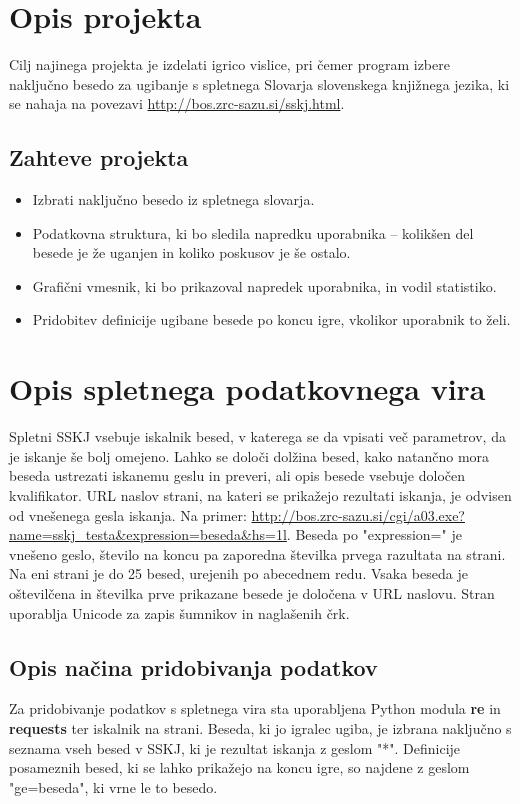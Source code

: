 \documentclass [a4paper, 12pt] {article}
\begin{document}
\section {Opis projekta}
Cilj najinega projekta je izdelati igrico vislice, pri čemer program izbere naključno besedo za ugibanje s spletnega Slovarja slovenskega knjižnega jezika, ki se nahaja na povezavi \url {http://bos.zrc-sazu.si/sskj.html}.
\subsection {Zahteve projekta}
\begin {itemize}
\item Izbrati naključno besedo iz spletnega slovarja.
\item Podatkovna struktura, ki bo sledila napredku uporabnika -- kolikšen del besede je že uganjen in koliko poskusov je še ostalo.
\item Grafični vmesnik, ki bo prikazoval napredek uporabnika, in vodil statistiko.
\item  Pridobitev definicije ugibane besede po koncu igre, vkolikor uporabnik to želi.
\end {itemize}

\section {Opis spletnega podatkovnega vira}
Spletni SSKJ vsebuje iskalnik besed, v katerega se da vpisati več parametrov, da je iskanje še bolj omejeno. Lahko se določi dolžina besed, kako natančno mora beseda ustrezati iskanemu geslu in preveri, ali opis besede vsebuje določen kvalifikator. URL naslov strani, na kateri se prikažejo rezultati iskanja, je odvisen od vnešenega gesla iskanja. Na primer: \url {http://bos.zrc-sazu.si/cgi/a03.exe?name=sskj_testa&expression=beseda&hs=1l}. Beseda po "expression=" je vnešeno geslo, število na koncu pa zaporedna številka prvega razultata na strani. Na eni strani je do 25 besed, urejenih po abecednem redu. Vsaka beseda je oštevilčena in številka prve prikazane besede je določena v URL naslovu. Stran uporablja Unicode za zapis šumnikov in naglašenih črk.
\subsection {Opis načina pridobivanja podatkov}
Za pridobivanje podatkov s spletnega vira sta uporabljena Python modula \textbf {re} in \textbf {requests} ter iskalnik na strani. Beseda, ki jo igralec ugiba, je izbrana naključno s seznama vseh besed v SSKJ, ki je rezultat iskanja z geslom "*". Definicije posameznih besed, ki se lahko prikažejo na koncu igre, so najdene z geslom "ge=beseda", ki vrne le to besedo.
\end{document}
